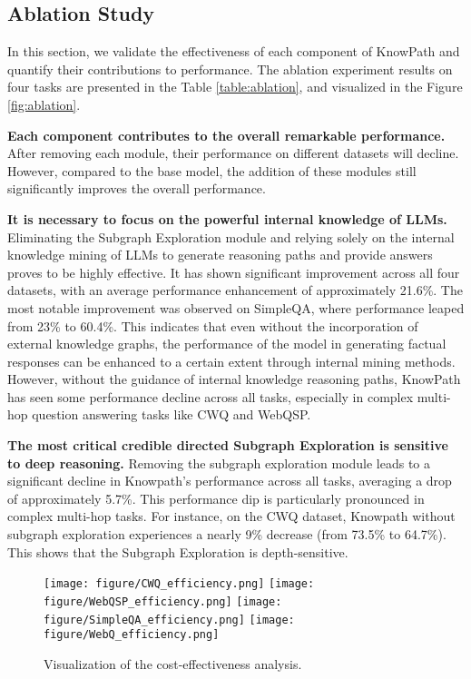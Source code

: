 \subsection{Ablation Study}
In this section, we validate the effectiveness of each component of KnowPath and quantify their contributions to performance. The ablation experiment results on four tasks are presented in the Table \ref{table:ablation}, and visualized in the Figure \ref{fig:ablation}.

\textbf{Each component contributes to the overall remarkable performance.}
After removing each module, their performance on different datasets will decline. However, compared to the base model, the addition of these modules still significantly improves the overall performance.


\textbf{It is necessary to focus on the powerful internal knowledge of LLMs.}
Eliminating the Subgraph Exploration module and relying solely on the internal knowledge mining of LLMs to generate reasoning paths and provide answers proves to be highly effective. 
It has shown significant improvement across all four datasets, with an average performance enhancement of approximately 21.6\%. The most notable improvement was observed on SimpleQA, where performance leaped from 23\% to 60.4\%.
This indicates that even without the incorporation of external knowledge graphs, the performance of the model in generating factual responses can be enhanced to a certain extent through internal mining methods.
However, without the guidance of internal knowledge reasoning paths, KnowPath has seen some performance decline across all tasks, especially in complex multi-hop question answering tasks like CWQ and WebQSP.

\textbf{The most critical credible directed Subgraph Exploration is sensitive to deep reasoning.}
Removing the subgraph exploration module leads to a significant decline in Knowpath's performance across all tasks, averaging a drop of approximately 5.7\%. This performance dip is particularly pronounced in complex multi-hop tasks. For instance, on the CWQ dataset, Knowpath without subgraph exploration experiences a nearly 9\% decrease (from 73.5\% to 64.7\%).
This shows that the Subgraph Exploration is depth-sensitive.



\begin{figure*}[h]
  \centering
  \texttt{[image: figure/CWQ\_efficiency.png]}
  \texttt{[image: figure/WebQSP\_efficiency.png]}
  \hspace{0.01\linewidth}
  \texttt{[image: figure/SimpleQA\_efficiency.png]}
  \texttt{[image: figure/WebQ\_efficiency.png]}
  \caption{Visualization of the cost-effectiveness analysis.}
  \label{fig:efficiency-analysis}
\end{figure*}
